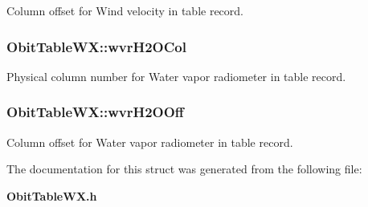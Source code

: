 Column offset for Wind velocity in table record. 

\subsubsection{ {\bf Obit\-Table\-WX::wvr\-H2OCol}}\label{structObitTableWX_o37}


Physical column number for Water vapor radiometer in table record. 

\subsubsection{ {\bf Obit\-Table\-WX::wvr\-H2OOff}}\label{structObitTableWX_o36}


Column offset for Water vapor radiometer in table record. 



The documentation for this struct was generated from the following file:\begin{CompactItemize}
\item 
{\bf Obit\-Table\-WX.h}\end{CompactItemize}
